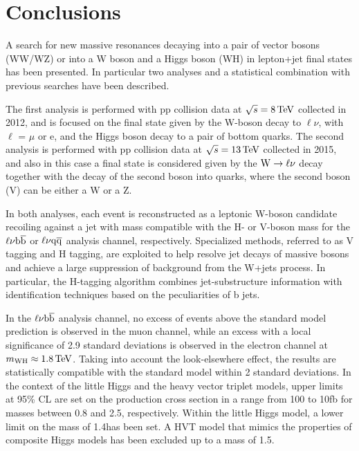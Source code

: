 \chapter{Conclusions}
\label{ch:summary1}

A search for new massive resonances decaying into a pair of vector bosons (WW/WZ) or into a W boson and a Higgs boson (WH)
in lepton+jet final states has been presented. In particular two analyses and a statistical combination with previous searches have been described.

The first analysis is performed with pp collision data at $\sqrt{s} = 8\,\text{Te\hspace{-.08em}V}$ collected in 2012, and is focused on the final state given by the W-boson decay to $\ell\nu$, with $\ell$ = $\mu$ or e,
and the Higgs boson decay to a pair of bottom quarks.
The second analysis is performed with pp collision data at $\sqrt{s} = 13\,\text{Te\hspace{-.08em}V}$ collected in 2015, and also in this case a final state is considered given by the $\mathrm{W}\to\ell\nu$ decay together with the decay of the second boson into quarks, where the second boson (V) can be either a W or a Z. 

In both analyses, each event is reconstructed as a leptonic W-boson candidate recoiling against a jet with mass compatible with the H- or V-boson mass for the $\ell\nu{\mathrm{b}\overline{\mathrm{b}}}$ or $\ell\nu\mathrm{q}\overline{\mathrm{q}}$ analysis channel, respectively.
Specialized methods, referred to as V tagging and H tagging, are exploited to help resolve jet decays of massive bosons and achieve a large suppression of background from the W+jets process.
In particular, the H-tagging algorithm combines jet-substructure information with identification techniques based on the peculiarities of b jets.

In the $\ell\nu{\mathrm{b}\overline{\mathrm{b}}}$ analysis channel, no excess of events above the standard model prediction is observed in the muon channel,
while an excess with a local significance of 2.9 standard deviations is observed in the electron channel at $m_{\rm WH} \approx 1.8\,\text{Te\hspace{-.08em}V}$.
Taking into account the look-elsewhere effect, the results are statistically compatible with the standard model within 2 standard deviations.
In the context of the little Higgs and the heavy vector triplet models, upper limits at 95\% CL are set on the \Wpr production cross section
in a range from 100 to 10\unit{fb} for masses between 0.8 and 2.5\TeV, respectively.
Within the little Higgs model, a lower limit on the \Wpr mass of 1.4\TeV has been set.
A HVT model that mimics the properties of composite Higgs models has been excluded up to a \Wpr mass of 1.5\TeV.

